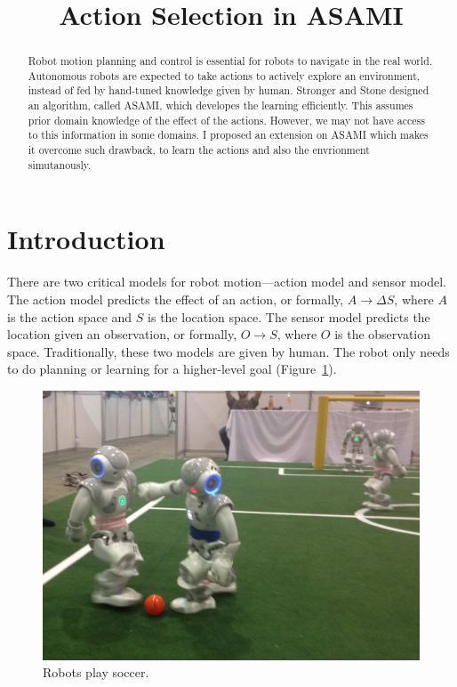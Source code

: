 \documentclass[10pt]{article}
\title{Action Selection in ASAMI}
\date{}
\begin{document}
\maketitle

\begin{abstract}
Robot motion planning and control is essential for robots to navigate
in the real world.
Autonomous robots are expected to take actions to actively explore an
environment, instead of fed by hand-tuned knowledge given by human.
Stronger and Stone designed an algorithm, called ASAMI, which
developes the learning efficiently. This assumes prior domain
knowledge of the effect of the actions. However, we may not have
access to this information in some domains. I proposed an extension on
ASAMI which makes it overcome such drawback, to learn the actions and
also the envrionment simutanously.
\end{abstract}

\section{Introduction}

There are two critical models for robot motion---action model and
sensor model. The action model predicts the effect of an action,
or formally, $A \rightarrow \Delta S$, where $A$ is the action space
and $S$ is the location space. The sensor model predicts the
location given an observation, or formally, $O \rightarrow S$, where
$O$ is the observation space. Traditionally, these two models are
given by human. The robot only needs to do planning or learning for a
higher-level goal (Figure~\ref{fig:robocup}).

\begin{figure}
\centering
\includegraphics[width=0.7\columnwidth]{Robocup.png}
\caption{Robots play soccer. \cite{LNAI12-Barrett}}
\label{fig:robocup}
\end{figure}
\end{document}
